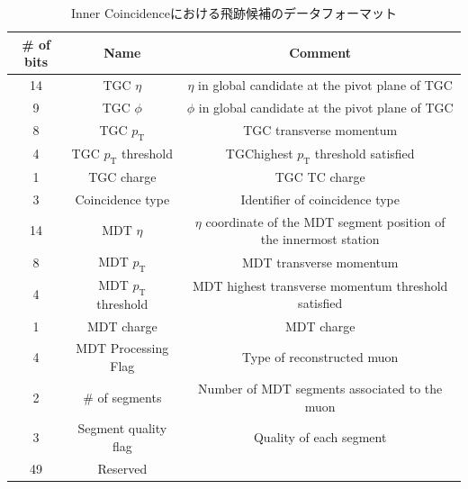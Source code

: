 \begin{table}[]
    \centering
    \caption{Inner Coincidenceにおける飛跡候補のデータフォーマット}
    \label{tab:InnerCoin}
    \begin{tabular}{|c|c|c|}
    \hline
    \# of bits & Name                             & Comment                                                                \\ \hline\hline
    14         & TGC $\eta$                       & $\eta$ in global candidate at the pivot plane of TGC                   \\ \hline
    9          & TGC $\phi$                       & $\phi$ in global candidate at the pivot plane of TGC                   \\ \hline
    8          & TGC $p_\mathrm{T}$               & TGC transverse momentum                                                \\ \hline
    4          & TGC $p_\mathrm{T}$ threshold     & TGChighest $p_\mathrm{T}$     threshold satisfied                       \\ \hline
    1          & TGC charge                       & TGC TC charge                                                          \\ \hline
    3          & Coincidence type                 & Identifier of coincidence type                                         \\ \hline
    14         & MDT $\eta$                       & $\eta$ coordinate of the MDT segment position of the innermost station \\ \hline
    8          & MDT $p_\mathrm{T}$               & MDT transverse momentum                                                \\ \hline
    4          & MDT $p_\mathrm{T}$ threshold     & MDT highest transverse momentum threshold satisfied                         \\ \hline
    1          & MDT charge                       & MDT charge                                                             \\ \hline
    4          & MDT Processing Flag              & Type of reconstructed muon                                             \\ \hline
    2          & \# of segments                   & Number of MDT segments associated to the muon                          \\ \hline
    3          & Segment quality flag             & Quality of each segment                                                \\ \hline
    49         & Reserved                         &                                                                        \\ \hline
    \end{tabular}
\end{table}


